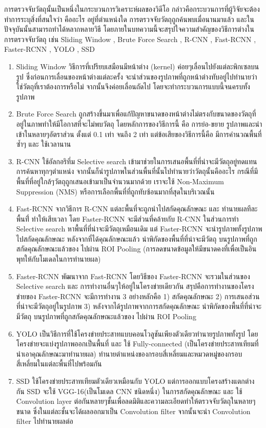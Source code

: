 การตรวจจับวัตถุนั้นเป็นหนึ่งในกระบวนการวิเคราะห์ผลของวิดีโอ กล่าวคือกระบวนการที่ผู้วิจัยจะต้องทำการระบุสิ่งที่สนใจว่า คืออะไร อยู่ที่ตำแหน่งใด 	การตรวจจับวัตถุถูกค้นพบเมื่อนานมาแล้ว และในปัจจุบันนั้นสามารถทำได้หลากหลายวิธี โดยภายในบทความนี้จะสรุปใจความสำคัญของวิธีการต่างในการตรวจจับวัตถุ เช่น Sliding Window , Brute Force Search , R-CNN , Fast-RCNN , Faster-RCNN , YOLO , SSD 
\begin{enumerate}
		\item Sliding Window วิธีการที่เปรียบเสมือนมีหน้าต่าง (kernel) ค่อยๆเลื่อนไปยังแต่ละพิกเซลบนรูป ซึ่งก่อนการเลื่อนของหน้าต่างแต่ละครั้ง จะนำส่วนของรูปภาพที่ถูกหน้าต่างทับอยู่ไปทำนายว่าใช่วัตถุที่เราต้องการหรือไม่ จากนั้นจึงค่อยเลื่อนถัดไป โดยจะทำกระบวนการแบบนี้จนครบทั้งรูปภาพ
	\item Brute Force Search ถูกสร้างขึ้นมาเพื่อแก้ปัญหาขนาดของหน้าต่างไม่ตรงกับขนาดของวัตถุที่อยู่ในภาพทำให้มีโอกาสที่จะไม่พบวัตถุ โดยหลักการของวิธีการนี้ คือ การย่อ-ขยาย รูปภาพและนำเข้าในหลายๆอัตราส่วน ตั้งแต่ 0.1 เท่า จนถึง 2 เท่า แต่ข้อเสียของวิธีการนี้คือ มีการคำนวณพื้นที่ซ้ำๆ และ ใช้เวลานาน
	\item R-CNN ใช้อัลกอริทึ่ม Selective search เข้ามาช่วยในการเสนอพื้นที่ที่น่าจะมีวัตถุอยู่ทดแทนการค้นหาทุกๆตำแหน่ง จากนั้นก็นำรูปภาพในส่วนพื้นที่นั้นไปทำนายว่าวัตถุนั้นคืออะไร กรณีที่มีพื้นที่ที่อยู่ใกล้ๆวัตถุถูกเสนอเข้ามาเป็นจำนวนมากด้วย เราจะใช้ Non-Maximum Suppression (NMS) หรือการเลือกพื้นที่ที่ถูกทับซ้อนมากที่สุดในบริเวณนั้น
	\item Fast-RCNN จากวิธีการ R-CNN แต่ละพื้นที่จะถูกนำไปสกัดคุณลักษณะ และ ทำนายผลทีละพื้นที่่ ทำให้เสียเวลา โดย Faster-RCNN จะมีส่วนที่คล้ายกับ R-CNN ในส่วนการทำ Selective search หาพื้นที่ที่น่าจะมีวัตถุเหมือนเดิม แต่ Faster-RCNN จะนำรูปภาพทั้งรูปภาพไปสกัดคุณลักษณะ หลังจากที่ได้คุณลักษณะแล้ว นำพิกัดของพื้นที่ที่น่าจะมีวัตถุ บนรูปภาพที่ถูกสกัดคุณลักษณะแล้วของ ไปผ่าน ROI Pooling (การลดขนาดข้อมูลให้มีขนาดคงที่เพื่อเป็นอินพุทให้กับโมเดลในการทำนายผล)
	\item Faster-RCNN พัฒนาจาก Fast-RCNN โดยวิธีของ Faster-RCNN จะรวมในส่วนของ Selective search และ การทำงานอื่นๆให้อยู่ในโครงข่ายเดียวกัน สรุปคือการทำงานของโครงข่ายของ Faster-RCNN จะมีการทำงาน 3 อย่างหลักคือ 1) สกัดคุณลักษณะ 2) การเสนอส่วนที่น่าจะมีวัตถุอยู่ในรูปภาพ 3) หลังจากได้รูปภาพจากการสกัดคุณลักษณะ นำพิกัดของพื้นที่ที่น่าจะมีวัตถุ บนรูปภาพที่ถูกสกัดคุณลักษณะแล้วของ ไปผ่าน ROI Pooling
	\item YOLO เป็นวิธีการที่ใช้โครงข่ายประสาทแบบคอนโวลูชันเพียงตัวเดียวทำนายรูปภาพทั้งรูป โดยโครงข่ายจะแบ่งรูปภาพออกเป็นพื้นที่ และ ใช้ Fully-connected (เป็นโครงข่ายประสาทเทียมที่นำเอาคุณลักษณะมาทำนายผล) ทำนายตำแหน่งของกรอบสี่เหลี่ยมและหมวดหมู่ของกรอบสี่เหลี่ยมในแต่ละพื้นที่ไปพร้อมกัน 
	\item SSD ใช้โครงข่ายประสาทเทียมตัวเดียวเหมือนกับ YOLO แต่การออกแบบโครงสร้างแตกต่างกัน SSD จะใช้ VGG-16(เป็นโมเดล CNN ชนิดหนึ่ง) ในการสกัดคุณลักษณะ และ ใช้ Convolution layer ต่อกันหลายๆชั้นเพื่อลดมิติและความละเอียดทำให้ตรวจจับวัตถุในหลายๆขนาด ซึ่งในแต่ละชั้นจะได้ผลออกมาเป็น Convolution filter จากนั้นจะนำ Convolution filter ไปทำนายผลต่อ
\end{enumerate}

